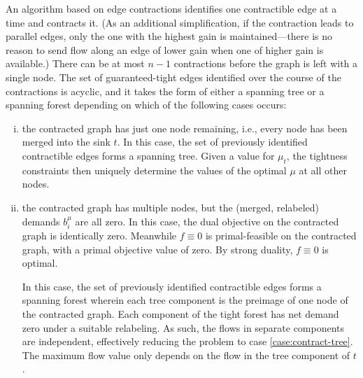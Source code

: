 \documentclass[11pt]{article}
\makeatletter
\let\comment\todo
\newcommand{\david}[1]{\comment[nolist,color=orange!40]{@david\\ #1}}
\theoremstyle{definition}
\theoremstyle{definition}
\theoremstyle{definition}
\newcommand{\biu}{b_{i}^{\mu}}
\renewcommand{\todo}[1]{\hl{TODO: #1}}
\makeatother
\begin{document}
	An algorithm based on edge contractions identifies one contractible
	edge at a time and contracts it. 
    (As an additional simplification, if the contraction leads to parallel edges,
	only the one with the highest gain is maintained---there is no reason to send
	flow along an edge of lower gain when one of higher gain is available.)
	There can be at most $n - 1$ contractions
	before the graph is left with a single node. The set of guaranteed-tight edges identified
	over the course of the contractions is acyclic, and it takes the form of
	either a spanning tree or a spanning forest depending on which of the following
	cases occurs:
	\begin{enumerate}[(i),itemsep=0mm]
		\item \label{case:contract-tree} the contracted graph has just one node remaining, i.e., every node has been merged
	into the sink $t$. In this case, the set of previously identified
	contractible edges forms a spanning tree. Given a value for $\mu_t$, the tightness
	constraints then uniquely determine the values of the optimal $\mu$ at all other nodes.
	
	\item the contracted graph has multiple nodes, but the (merged, relabeled)
	demands $\biu$ are all zero. In this case, the dual objective on the contracted
	graph is identically zero. Meanwhile $f \equiv 0$ is primal-feasible on the contracted
	graph, with a primal objective value of zero. By strong duality, $f \equiv 0$ is optimal.
	
	In this case, the set of previously identified contractible edges
	forms a spanning forest wherein each tree component is the preimage of one node
	of the contracted graph.
	Each component of the tight forest has net demand zero under a suitable relabeling.
	As such, the flows in separate components are independent, effectively reducing
	the problem to case \ref{case:contract-tree}. The maximum flow value only depends on the flow in the
	tree component of $t$.
	\end{enumerate}
	
	
\end{document}
